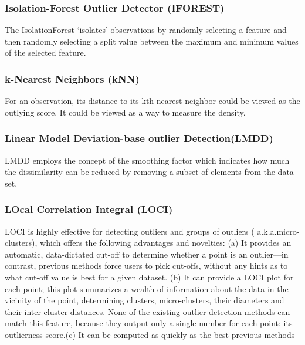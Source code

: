 \subsubsection{Isolation-Forest Outlier Detector (IFOREST)}
The IsolationForest ‘isolates’ observations by randomly selecting a feature and then randomly selecting a split value between the maximum and minimum values of the selected feature.
\cite{tony2012iforest}
\cite{tony2008iforest}

\subsubsection{k-Nearest Neighbors (kNN)}
For an observation, its distance to its kth nearest neighbor could be viewed as the outlying score.
It could be viewed as a way to measure the density.
\cite{sridhar2000knn}
\cite{fabrizio2002knn}

\subsubsection{Linear Model Deviation-base outlier Detection(LMDD)}
LMDD employs the concept of the smoothing factor which indicates how much the dissimilarity can be reduced by removing a subset of elements from the data-set.
\cite{arning1996lmdd}

\subsubsection{LOcal Correlation Integral (LOCI)}
LOCI is highly effective for detecting outliers and groups of outliers ( a.k.a.micro-clusters), which offers the following advantages and novelties: (a) It provides an automatic, data-dictated cut-off to determine whether a point is an outlier—in contrast, previous methods force users to pick cut-offs, without any hints as to what cut-off value is best for a given dataset. (b) It can provide a LOCI plot for each point; this plot summarizes a wealth of information about the data in the vicinity of the point, determining clusters, micro-clusters, their diameters and their inter-cluster distances. None of the existing outlier-detection methods can match this feature, because they output only a single number for each point: its outlierness score.(c) It can be computed as quickly as the best previous methods
\cite{papadimitriou2003loci}

